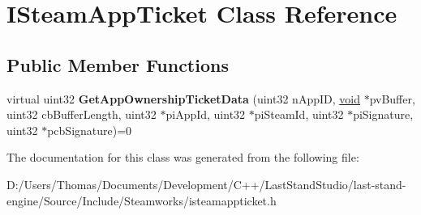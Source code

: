 \hypertarget{classISteamAppTicket}{}\section{I\+Steam\+App\+Ticket Class Reference}
\label{classISteamAppTicket}
\subsection*{Public Member Functions}
\begin{DoxyCompactItemize}
\item 
\hypertarget{classISteamAppTicket_ae9a3e810afbffdf3d1a9206f48320193}{}virtual uint32 {\bfseries Get\+App\+Ownership\+Ticket\+Data} (uint32 n\+App\+I\+D, \hyperlink{SDL__audio_8h_a52835ae37c4bb905b903cbaf5d04b05f}{void} $\ast$pv\+Buffer, uint32 cb\+Buffer\+Length, uint32 $\ast$pi\+App\+Id, uint32 $\ast$pi\+Steam\+Id, uint32 $\ast$pi\+Signature, uint32 $\ast$pcb\+Signature)=0\label{classISteamAppTicket_ae9a3e810afbffdf3d1a9206f48320193}

\end{DoxyCompactItemize}


The documentation for this class was generated from the following file\+:\begin{DoxyCompactItemize}
\item 
D\+:/\+Users/\+Thomas/\+Documents/\+Development/\+C++/\+Last\+Stand\+Studio/last-\/stand-\/engine/\+Source/\+Include/\+Steamworks/isteamappticket.\+h\end{DoxyCompactItemize}
